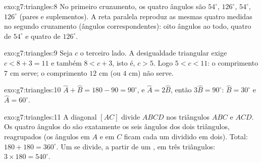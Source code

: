 \begin{solution}{exo:g7:triangles:8}
No primeiro cruzamento, os quatro ângulos são $54^\circ$, $126^\circ$,
$54^\circ$, $126^\circ$ (pares  e suplementos). A
reta paralela reproduz as mesmas quatro medidas no segundo cruzamento
(ângulos correspondentes): oito ângulos ao todo, quatro de $54^\circ$ e
quatro de $126^\circ$.
\end{solution}

\begin{solution}{exo:g7:triangles:9}
Seja $c$ o terceiro lado. A desigualdade triangular exige
$c < 8 + 3 = 11$ e também $8 < c + 3$, isto é, $c > 5$. Logo
$5 < c < 11$: o comprimento $7$ cm serve; o comprimento $12$ cm (ou
$4$ cm) não serve.
\end{solution}

\begin{solution}{exo:g7:triangles:10}
$\widehat A + \widehat B = 180 - 90 = 90^\circ$, e
$\widehat A = 2\widehat B$, então $3\widehat B = 90^\circ$:
$\widehat B = 30^\circ$ e $\widehat A = 60^\circ$.
\end{solution}

\begin{solution}{exo:g7:triangles:11}
A diagonal $[AC]$ divide $ABCD$ nos triângulos $ABC$ e $ACD$. Os quatro
ângulos do  são exatamente os seis ângulos dos dois
triângulos, reagrupados (os ângulos em $A$ e em $C$ ficam cada um
dividido em dois). Total: $180 + 180 = 360^\circ$. Um  se
divide, a partir de um , em três triângulos:
$3 \times 180 = 540^\circ$.
\end{solution}

